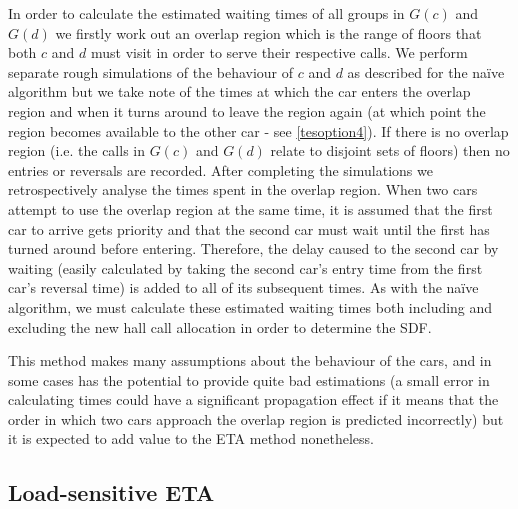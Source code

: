 \documentclass{UoYCSproject}
\begin{document}
In order to calculate the estimated waiting times of all groups in $G(c)$ and $G(d)$ we firstly work out an overlap region which is the range of floors that both $c$ and $d$ must visit in order to serve their respective calls.  We perform separate rough simulations of the behaviour of $c$ and $d$ as described for the na\"{i}ve algorithm but we take note of the times at which the car enters the overlap region and when it turns around to leave the region again (at which point the region becomes available to the other car - see \autoref{tesoption4}).  If there is no overlap region (i.e. the calls in $G(c)$ and $G(d)$ relate to disjoint sets of floors) then no entries or reversals are recorded.  After completing the simulations we retrospectively analyse the times spent in the overlap region.  When two cars attempt to use the overlap region at the same time, it is assumed that the first car to arrive gets priority and that the second car must wait until the first has turned around before entering.  Therefore, the delay caused to the second car by waiting (easily calculated by taking the second car's entry time from the first car's reversal time) is added to all of its subsequent times.  As with the na\"{i}ve algorithm, we must calculate these estimated waiting times both including and excluding the new hall call allocation in order to determine the SDF.

This method makes many assumptions about the behaviour of the cars, and in some cases has the potential to provide quite bad estimations (a small error in calculating times could have a significant propagation effect if it means that the order in which two cars approach the overlap region is predicted incorrectly) but it is expected to add value to the ETA method nonetheless.

\subsection{Load-sensitive ETA}
\end{document}
